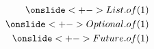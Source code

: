 \begin{align*}
  \onslide<+->{List.of(1)} \\
  \onslide<+->{Optional.of(1)} \\
  \onslide<+->{Future.of(1)}
\end{align*}
